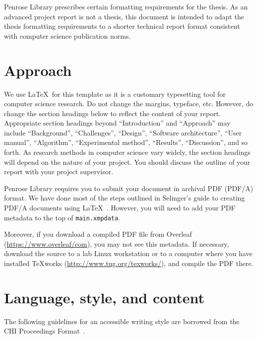 \documentclass{article}
\begin{document}
Penrose Library prescribes certain formatting requirements for the thesis. As an advanced project report is not a thesis, this document is intended to adapt the thesis formatting requirements to a shorter technical report format consistent with computer science publication norms. 

\section{Approach}

We use \LaTeX\ for this template as it is a customary typesetting tool for computer science research. Do not change the margins, typeface, etc. However, do change the section headings below to reflect the content of your report. Appropriate section headings beyond ``Introduction'' and ``Approach'' may include ``Background'', ``Challenges'', ``Design'', ``Software architecture'', ``User manual'', ``Algorithm'', ``Experimental method'', ``Results'', ``Discussion'',  and so forth. As research methods in computer science vary widely, the section headings will depend on the nature of your project. You should discuss the outline of your report with your project supervisor.

Penrose Library requires you to submit your document in archival PDF (PDF/A) format.  We have done most of the steps outlined in Selinger's guide to creating PDF/A documents using \LaTeX~\cite{Selinger:pdfa}. However, you will need to add your PDF metadata to the top of \texttt{main.xmpdata}. 

Moreover, if you download a compiled PDF file from Overleaf (\url{https://www.overleaf/com}), you may not see this metadata. 
If necessary, download the source to a lab Linux workstation or to a computer where you have installed TeXworks (\url{http://www.tug.org/texworks/}), and compile the PDF there.  

\section{Language, style, and content}

The following guidelines for an accessible writing style are borrowed from the CHI Proceedings Format~\cite{CHI}.
\end{document}
